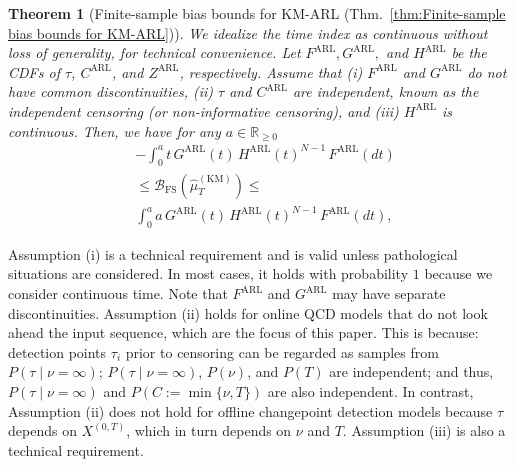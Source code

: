 \documentclass{article}
\theoremstyle{plain}
\newtheorem{theorem}{Theorem}[section]
\theoremstyle{definition}
\theoremstyle{remark}
\def\mbr{\mathbb{R}}
\begin{document}
\begin{theorem}[Finite-sample bias bounds for KM-ARL (Thm.~\ref{thm:Finite-sample bias bounds for KM-ARL})] \label{thm:Finite-sample bias bounds for KM-ARL (Appendix)} 
    We idealize the time index as continuous without loss of generality, for technical convenience.
    Let $F^\mathrm{ARL}, G^\mathrm{ARL},$ and $H^\mathrm{ARL}$ be the CDFs of $\tau$, $C^\mathrm{ARL}$, and $Z^\mathrm{ARL}$, respectively. 
    Assume that (i) $F^\mathrm{ARL}$ and $G^\mathrm{ARL}$ do not have common discontinuities,  (ii) $\tau$ and $C^\mathrm{ARL}$ are independent, known as the \textit{independent censoring} (or non-informative censoring), and (iii) $H^\mathrm{ARL}$ is continuous. Then, we have for any $a \in \mbr_{\geq 0}$
    \begin{align}
        &-\int_0^{a} t \,G^\mathrm{ARL}(t)\,{H^\mathrm{ARL}}(t)^{N-1}\,F^\mathrm{ARL}(dt) \\
        &\leq
        \mathcal{B}_\mathrm{FS}(\hat{\mu}_T^\mathrm{(KM)}) 
        \leq \\ 
        &\int_0^{a} a\,G^\mathrm{ARL}(t)\,{H^\mathrm{ARL}}(t)^{N-1}\,F^\mathrm{ARL}(dt),
    \end{align}
\end{theorem}
Assumption (i) is a technical requirement and is valid unless pathological situations are considered. 
In most cases, it holds with probability $1$ because we consider continuous time.
Note that $F^\mathrm{ARL}$ and $G^\mathrm{ARL}$ may have separate discontinuities.
Assumption (ii) holds for online QCD models that do not look ahead the input sequence, which are the focus of this paper.
This is because: detection points $\tau_i$ prior to censoring can be regarded as samples from $P(\tau \mid \nu=\infty)$;  $P(\tau \mid \nu=\infty)$, $P(\nu)$, and $P(T)$ are independent; and thus, $P(\tau \mid \nu=\infty)$ and $P(C:= \min\{\nu, T\})$ are also independent.
In contrast, Assumption (ii) does not hold for offline changepoint detection models because $\tau$ depends on $X^{(0, T)}$, which in turn depends on $\nu$ and $T$.
Assumption (iii) is also a technical requirement.
\end{document}
